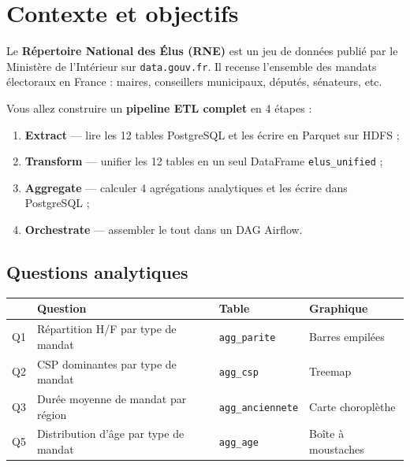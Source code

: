 \documentclass[11pt,a4paper]{article}
\begin{document}
\newpage

\section{Contexte et objectifs}

Le \textbf{Répertoire National des Élus (RNE)} est un jeu de données publié par le Ministère de l'Intérieur sur \texttt{data.gouv.fr}. Il recense l'ensemble des mandats électoraux en France : maires, conseillers municipaux, députés, sénateurs, etc.

Vous allez construire un \textbf{pipeline ETL complet} en 4 étapes :
\begin{enumerate}
  \item \textbf{Extract} — lire les 12 tables PostgreSQL et les écrire en Parquet sur HDFS ;
  \item \textbf{Transform} — unifier les 12 tables en un seul DataFrame \texttt{elus\_unified} ;
  \item \textbf{Aggregate} — calculer 4 agrégations analytiques et les écrire dans PostgreSQL ;
  \item \textbf{Orchestrate} — assembler le tout dans un DAG Airflow.
\end{enumerate}

\subsection*{Questions analytiques}

\begin{center}
\begin{tabular}{clll}
  \toprule
  & \textbf{Question} & \textbf{Table} & \textbf{Graphique} \\
  \midrule
  Q1 & Répartition H/F par type de mandat       & \texttt{agg\_parite}     & Barres empilées \\
  Q2 & CSP dominantes par type de mandat         & \texttt{agg\_csp}        & Treemap \\
  Q3 & Durée moyenne de mandat par région        & \texttt{agg\_anciennete} & Carte choroplèthe \\
  Q5 & Distribution d'âge par type de mandat     & \texttt{agg\_age}        & Boîte à moustaches \\
  \bottomrule
\end{tabular}
\end{center}
\end{document}
